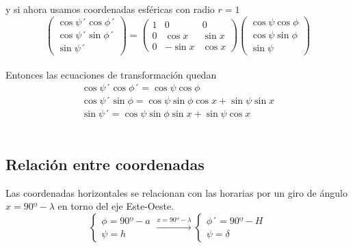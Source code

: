 \documentclass[openany]{book}
\theoremstyle{ucostyle}
\begin{document}
y si ahora usamos coordenadas esféricas con radio $r=1$
\begin{equation*}
    \begin{pmatrix}
        \cos\psi´\cos\phi ´
        \\
        \cos \psi´\sin \phi´
        \\
        \sin\psi´
    \end{pmatrix}=
    \begin{pmatrix}
        1&0&0
        \\
        0&\cos x&\sin x
        \\
        0&-\sin x & \cos x
    \end{pmatrix}
        \begin{pmatrix}
        \cos\psi\cos\phi 
        \\
        \cos \psi\sin \phi
        \\
        \sin\psi
    \end{pmatrix}
\end{equation*}
\\

Entonces las ecuaciones de transformación quedan
\begin{align*}
    \cos\psi´\cos\phi´=\cos \psi \cos \phi
    \\
    \cos\psi´\sin \phi=\cos \psi\sin\phi \cos x +\sin \psi\sin x
    \\
    \sin\psi´=\cos\psi \sin \phi \sin x + \sin \psi \cos x 
\end{align*}
\\

\subsection{Relación entre coordenadas}

Las coordenadas horizontales se relacionan con las horarias por un giro de ángulo $x=90º-\lambda$ en torno del eje Este-Oeste.
\begin{equation*}
    \begin{cases}
        \phi=90º-a
        \\
        \psi=h
    \end{cases} \xrightarrow{x=90º - \lambda}
    \begin{cases}
        \phi´= 90º-H
        \\
        \psi= \delta
    \end{cases}
\end{equation*}
\\
\end{document}
